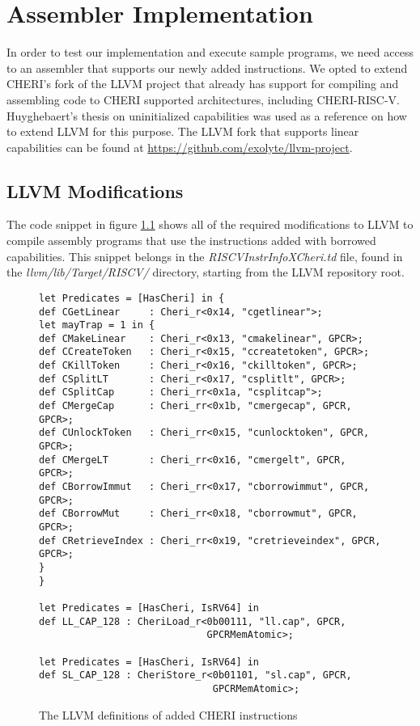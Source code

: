\chapter{Assembler Implementation}
\label{chap:assemblerimpl}
In order to test our implementation and execute sample programs, we need access to an assembler that supports our newly added instructions. We opted to extend CHERI's fork of the LLVM project that already has support for compiling and assembling code to CHERI supported architectures, including CHERI-RISC-V.
Huyghebaert's thesis on uninitialized capabilities \cite{uninitcap} was used as a reference on how to extend LLVM for this purpose.
The LLVM fork that supports linear capabilities can be found at \url{https://github.com/exolyte/llvm-project}.

\section{LLVM Modifications}
The code snippet in figure \ref{code:llvmdefs} shows all of the required modifications to LLVM to compile assembly programs that use the instructions added with borrowed capabilities. This snippet belongs in the \textit{RISCVInstrInfoXCheri.td} file, found in the \textit{llvm/lib/Target/RISCV/} directory, starting from the LLVM repository root.

\begin{figure}[h]
\begin{verbatim}
let Predicates = [HasCheri] in {
def CGetLinear     : Cheri_r<0x14, "cgetlinear">;
let mayTrap = 1 in {
def CMakeLinear    : Cheri_r<0x13, "cmakelinear", GPCR>;
def CCreateToken   : Cheri_r<0x15, "ccreatetoken", GPCR>;
def CKillToken     : Cheri_r<0x16, "ckilltoken", GPCR>;
def CSplitLT       : Cheri_r<0x17, "csplitlt", GPCR>;
def CSplitCap      : Cheri_rr<0x1a, "csplitcap">;
def CMergeCap      : Cheri_rr<0x1b, "cmergecap", GPCR, GPCR>;
def CUnlockToken   : Cheri_rr<0x15, "cunlocktoken", GPCR, GPCR>;
def CMergeLT       : Cheri_rr<0x16, "cmergelt", GPCR, GPCR>;
def CBorrowImmut   : Cheri_rr<0x17, "cborrowimmut", GPCR, GPCR>;
def CBorrowMut     : Cheri_rr<0x18, "cborrowmut", GPCR, GPCR>;
def CRetrieveIndex : Cheri_rr<0x19, "cretrieveindex", GPCR, GPCR>;
}
}

let Predicates = [HasCheri, IsRV64] in
def LL_CAP_128 : CheriLoad_r<0b00111, "ll.cap", GPCR,
                             GPCRMemAtomic>;

let Predicates = [HasCheri, IsRV64] in
def SL_CAP_128 : CheriStore_r<0b01101, "sl.cap", GPCR,
                              GPCRMemAtomic>;
\end{verbatim}
\caption{The LLVM definitions of added CHERI instructions}
\label{code:llvmdefs}
\end{figure}

